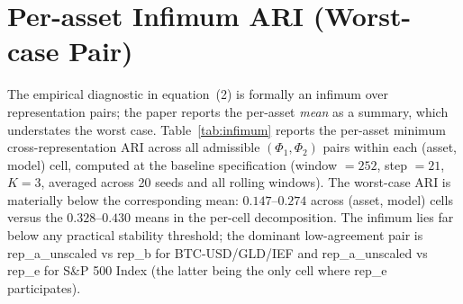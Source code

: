 \documentclass[preprint,12pt,authoryear]{elsarticle}
\newcommand{\SPX}{S\&P 500 Index}
\begin{document}
\section{Per-asset Infimum ARI (Worst-case Pair)}
\label{app:infimum}

The empirical diagnostic in equation~(2) is formally an infimum over representation pairs; the paper reports the per-asset \emph{mean} as a summary, which understates the worst case. Table~\ref{tab:infimum} reports the per-asset minimum cross-representation ARI across all admissible $(\Phi_1, \Phi_2)$ pairs within each (asset, model) cell, computed at the baseline specification (window $=252$, step $=21$, $K=3$, averaged across 20 seeds and all rolling windows). The worst-case ARI is materially below the corresponding mean: $0.147$--$0.274$ across (asset, model) cells versus the $0.328$--$0.430$ means in the per-cell decomposition. The infimum lies far below any practical stability threshold; the dominant low-agreement pair is rep\_a\_unscaled vs rep\_b for BTC-USD/GLD/IEF and rep\_a\_unscaled vs rep\_e for \SPX{} (the latter being the only cell where rep\_e participates).
\end{document}

